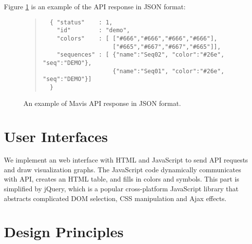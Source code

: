 Figure \ref{fig:api-res} is an example of the API response in JSON format:
\begin{figure}[hb]
\begin{quote}
\begin{verbatim}
  { "status"    : 1,
    "id"        : "demo",
    "colors"    : [ ["#666","#666","#666","#666"],
                    ["#665","#667","#667","#665"]],
    "sequences" : [ {"name":"Seq02", "color":"#26e", "seq":"DEMO"},
                    {"name":"Seq01", "color":"#26e", "seq":"DEMO"}]
  }
\end{verbatim}
\end{quote}
\caption[Example of API Response in JSON Format]{An example of Mavis API response in JSON format.}\label{fig:api-res}
\end{figure}

\section{User Interfaces}

We implement an web interface with HTML and JavaScript to send API requests and draw visualization graphs. The JavaScript code dynamically communicates with API, creates an HTML table, and fills in colors and symbols. This part is simplified by jQuery, which is a popular cross-platform JavaScript library that abstracts complicated DOM selection, CSS manipulation and Ajax effects.

\section{Design Principles}
